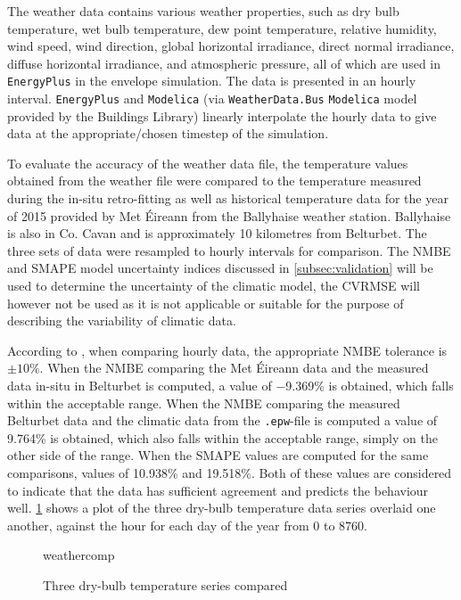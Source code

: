 The weather data contains various weather properties, such as dry bulb temperature, wet bulb temperature, dew point temperature, relative humidity, wind speed, wind direction, global horizontal irradiance, direct normal irradiance, diffuse horizontal irradiance, and atmospheric pressure, all of which are used in \texttt{EnergyPlus} in the envelope simulation. The data is presented in an hourly interval. \texttt{EnergyPlus} and \texttt{Modelica} (via \texttt{WeatherData.Bus} \texttt{Modelica} model provided by the Buildings Library) linearly interpolate the hourly data to give data at the appropriate/chosen timestep of the simulation. 

To evaluate the accuracy of the weather data file, the temperature values obtained from the weather file were compared to the temperature measured during the in-situ retro-fitting as well as historical temperature data for the year of 2015 provided by Met Éireann from the Ballyhaise weather station. Ballyhaise is also in Co. Cavan and is approximately 10 kilometres from Belturbet. The three sets of data were resampled to hourly intervals for comparison. The \ac{NMBE} and \ac{SMAPE} model uncertainty indices discussed in \cref{subsec:validation} will be used to determine the uncertainty of the climatic model, the \ac{CVRMSE} will however not be used as it is not applicable or suitable for the purpose of describing the variability of climatic data. 

According to  \cite{ashrae_guideline_project_committee_14_ashrae_2014}, when comparing hourly data, the appropriate \ac{NMBE} tolerance is $\pm10\%$. When the \ac{NMBE} comparing the Met Éireann data and the measured data  in-situ in Belturbet is computed, a value of \num{-9.369}\% is obtained, which falls within the acceptable range. When the \ac{NMBE} comparing the measured Belturbet data and the climatic data from the \texttt{.epw}-file is computed a value of \num{9.764}\% is obtained, which also falls within the acceptable range, simply on the other side of the range. When the \ac{SMAPE} values are computed for the same comparisons, values of \num{10.938}\% and \num{19.518}\%. Both of these values are considered to indicate that the data has sufficient agreement and predicts the behaviour well. \cref{fig:weathercomp} shows a plot of the three dry-bulb temperature data series overlaid one another, against the hour for each day of the year from 0 to 8760. 

\begin{figure}[htb]
    \centering
    {weathercomp}
    \caption{Three dry-bulb temperature series compared}
    \label{fig:weathercomp}
\end{figure}

